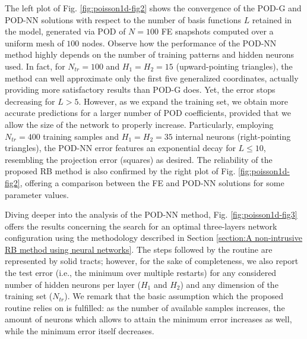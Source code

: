 \documentclass{elsarticle}
\numberwithin{equation}{section}
\theoremstyle{theorem}
\theoremstyle{definition}
\theoremstyle{remark}
\theoremstyle{proposition}
\numberwithin{figure}{section}
\begin{document}
		
		The left plot of Fig. \ref{fig:poisson1d-fig2} shows the convergence of the POD-G and POD-NN solutions with respect to the number of basis functions $L$ retained in the model, generated via POD of $N = 100$ FE snapshots computed over a uniform mesh of $100$ nodes. Observe how the performance of the POD-NN method highly depends on the number of training patterns and hidden neurons used. In fact, for $N_{tr} = 100$ and $H_1 = H_2 = 15$ (upward-pointing triangles), the method can well approximate only the first five generalized coordinates, actually providing more satisfactory results than POD-G does. Yet, the error stops decreasing for $L > 5$. However, as we expand the training set, we obtain more accurate predictions for a larger number of POD coefficients, provided that we allow the size of the network to properly increase. Particularly, employing $N_{tr} = 400$ training samples and $H_1 = H_2 = 35$ internal neurons (right-pointing triangles), the POD-NN error features an exponential decay for $L \leq 10$, resembling the projection error (squares) as desired. The reliability of the proposed RB method is also confirmed by the right plot of Fig. \ref{fig:poisson1d-fig2}, offering a comparison between the FE and POD-NN solutions for some parameter values.
				
		Diving deeper into the analysis of the POD-NN method, Fig. \ref{fig:poisson1d-fig3} offers the results concerning the search for an optimal three-layers network configuration using the methodology described in Section \ref{section:A non-intrusive RB method using neural networks}. The steps followed by the routine are represented by solid tracts; however, for the sake of completeness, we also report the test error (i.e., the minimum over multiple restarts) for any considered number of hidden neurons per layer ($H_1$ and $H_2$) and any dimension of the training set ($N_{tr}$). We remark that the basic assumption which the proposed routine relies on is fulfilled: as the number of available samples increases, the amount of neurons which allows to attain the minimum error increases as well, while the minimum error itself decreases.
		
\end{document}
